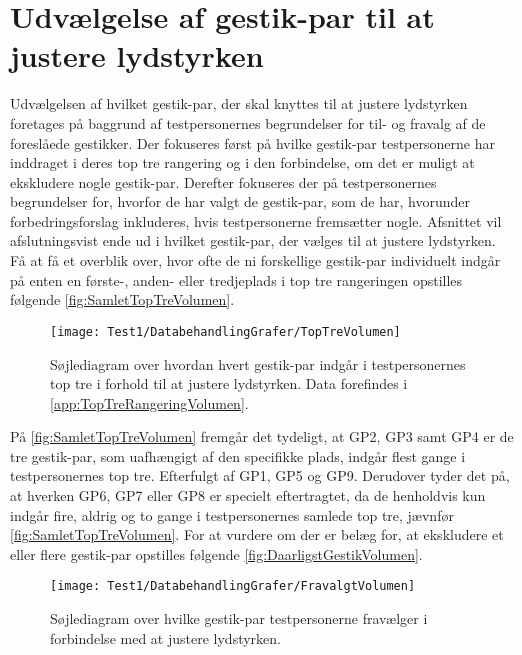 \section{Udvælgelse af gestik-par til at justere lydstyrken}
\label{TestresultaterVolumen}
%
Udvælgelsen af hvilket gestik-par, der skal knyttes til at justere lydstyrken foretages på baggrund af testpersonernes begrundelser for til- og fravalg af de foreslåede gestikker. Der fokuseres først på hvilke gestik-par testpersonerne har inddraget i deres top tre rangering og i den forbindelse, om det er muligt at ekskludere nogle gestik-par. Derefter fokuseres der på testpersonernes begrundelser for, hvorfor de har valgt de gestik-par, som de har, hvorunder forbedringsforslag inkluderes, hvis testpersonerne fremsætter nogle. Afsnittet vil afslutningsvist ende ud i hvilket gestik-par, der vælges til at justere lydstyrken.\blankline
%
Få at få et overblik over, hvor ofte de ni forskellige gestik-par individuelt indgår på enten en første-, anden- eller tredjeplads i top tre rangeringen opstilles følgende \autoref{fig:SamletTopTreVolumen}.
%
\begin{figure}[H]
	\centering
	\texttt{[image: Test1/DatabehandlingGrafer/TopTreVolumen]}
	\caption{Søjlediagram over hvordan hvert gestik-par indgår i testpersonernes top tre i forhold til at justere lydstyrken. Data forefindes i \autoref{app:TopTreRangeringVolumen}.}
	\label{fig:SamletTopTreVolumen}
\end{figure}
\noindent
%
På \autoref{fig:SamletTopTreVolumen} fremgår det tydeligt, at GP2, GP3 samt GP4 er de tre gestik-par, som uafhængigt af den specifikke plads, indgår flest gange i testpersonernes top tre. Efterfulgt af GP1, GP5 og GP9. Derudover tyder det på, at hverken GP6, GP7 eller GP8 er specielt eftertragtet, da de henholdvis kun indgår fire, aldrig og to gange i testpersonernes samlede top tre, jævnfør \autoref{fig:SamletTopTreVolumen}. For at vurdere om der er belæg for, at ekskludere et eller flere gestik-par opstilles følgende \autoref{fig:DaarligstGestikVolumen}. 
%
\begin{figure}[H]
	\centering
	\texttt{[image: Test1/DatabehandlingGrafer/FravalgtVolumen]}
	\caption{Søjlediagram over hvilke gestik-par testpersonerne fravælger i forbindelse med at justere lydstyrken.}
	\label{fig:DaarligstGestikVolumen}
\end{figure}
\noindent
%
